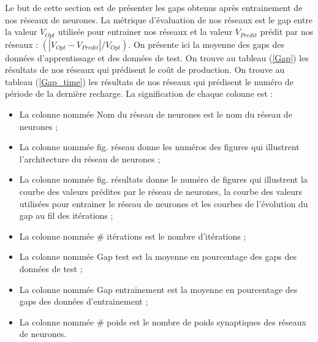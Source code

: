 Le but de cette section est de présenter les gaps obtenus après entrainement de nos réseaux de neurones. La métrique d'évaluation de nos réseaux est le gap entre la valeur $V_{Opt}$ utilisée pour entrainer nos réseaux et la valeur $V_{Predit}$ prédit par nos réseaux : $(|V_{Opt}-V_{Predit}|/V_{Opt})$. On présente ici la moyenne des gaps des données d'apprentissage et des données de test.
On trouve au tableau (\ref{Gap}) les résultats de nos réseaux qui prédisent le coût de production. On trouve au tableau (\ref{Gap_time}) les résultats de nos réseaux qui prédisent le numéro de période de la dernière recharge. La signification de chaque colonne est :
\begin{itemize}[label=$\square$]
	\item La colonne nommée \og Nom du réseau de neurones \fg{} est le nom du réseau de neurones ;
	\item La colonne nommée \og fig. réseau \fg{} donne les numéros des figures qui illustrent l'architecture du réseau de neurones ;
	\item La colonne nommée \og fig. résultats \fg{} donne le numéro de figures qui illustrent la courbe des valeurs prédites par le réseau de neurones, la courbe des valeurs utilisées pour entrainer le réseau de neurones et les courbes de l'évolution du gap au fil des itérations ;
	\item La colonne nommée \og \# itérations \fg{} est le nombre d'itérations ;
	\item La colonne nommée \og  Gap test\fg{} est la moyenne en pourcentage des gaps des données de test ;
	\item La colonne nommée \og Gap entrainement \fg{} est la moyenne en pourcentage des gaps des données d'entrainement ;
	\item La colonne nommée \og \# poids \fg{} est le nombre de poids synaptiques des réseaux de neurones.
\end{itemize}

